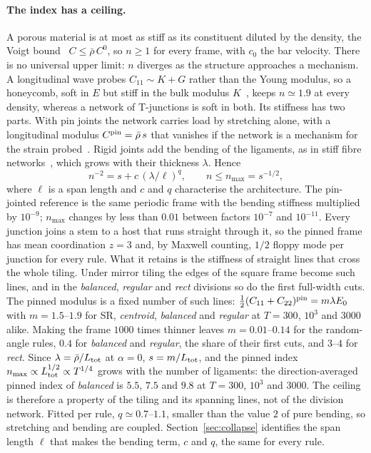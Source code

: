 \documentclass[aps,pre,twocolumn,superscriptaddress,amsmath,amssymb,floatfix]{revtex4-2}
\begin{document}
\paragraph*{The index has a ceiling.}
A porous material is at most as stiff as its constituent diluted by the density, the
Voigt bound~\cite{hill1952} $C\le\bar\rho\,C^{0}$, so $n\ge1$ for every frame, with $c_0$ the
bar velocity. There is
no universal upper limit: $n$ diverges as the structure approaches a mechanism. A
longitudinal wave probes $C_{11}\sim K+G$ rather than the Young modulus, so a honeycomb,
soft in $E$ but stiff in the bulk modulus $K$~\cite{deshpande2001}, keeps $n\simeq1.9$ at
every density, whereas a network of T-junctions is soft in both. Its stiffness has two
parts. With pin joints the network carries load by stretching alone, with a longitudinal
modulus $C^{\rm pin}=\bar\rho\,s$ that vanishes if the network is a mechanism for the strain
probed~\cite{maxwell1864}. Rigid joints add the bending of the ligaments, as in stiff fibre
networks~\cite{wilhelm2003,head2003,heussinger2006,broedersz2014}, which grows with their
thickness $\lambda$. Hence
\begin{equation}
n^{-2}=s+c\,(\lambda/\ell)^{q},\qquad n\le n_{\max}=s^{-1/2},
\label{eq:ceiling}
\end{equation}
where $\ell$ is a span length and $c$ and $q$ characterise the architecture. The
pin-jointed reference is the same periodic frame with the bending stiffness multiplied by
$10^{-9}$; $n_{\max}$ changes by less than $0.01$ between factors $10^{-7}$ and
$10^{-11}$. Every junction joins a stem to a host that runs straight through it, so the
pinned frame has mean coordination $z=3$ and, by Maxwell counting, $1/2$ floppy mode per
junction for every rule. What it retains is the stiffness of straight lines that cross the
whole tiling. Under mirror tiling the edges of the square frame become such lines, and in
the \emph{balanced}, \emph{regular} and \emph{rect} divisions so do the first full-width
cuts. The pinned modulus is a fixed number of such lines: $\tfrac12(C_{11}+C_{22})^{\rm
pin}=m\lambda E_0$ with $m=1.5$--$1.9$ for SR, \emph{centroid}, \emph{balanced} and
\emph{regular} at $T=300$, $10^3$ and $3000$ alike. Making the frame $1000$ times thinner
leaves $m=0.01$--$0.14$ for the random-angle rules, $0.4$ for \emph{balanced} and
\emph{regular}, the share of their first cuts, and $3$--$4$ for \emph{rect}. Since
$\lambda=\bar\rho/L_{\rm tot}$ at $\alpha=0$, $s=m/L_{\rm tot}$, and the pinned index
$n_{\max}\propto L_{\rm tot}^{1/2}\propto T^{1/4}$ grows with the number of ligaments: the
direction-averaged pinned index of \emph{balanced} is $5.5$, $7.5$ and $9.8$ at $T=300$,
$10^3$ and $3000$. The ceiling is therefore a property of the tiling and its spanning
lines, not of the division network. Fitted per rule, $q\simeq0.7$--$1.1$, smaller than the
value $2$ of pure bending, so stretching and bending are coupled.
Section~\ref{sec:collapse} identifies the span length $\ell$ that makes the bending term,
$c$ and $q$, the same for every rule.
\end{document}
